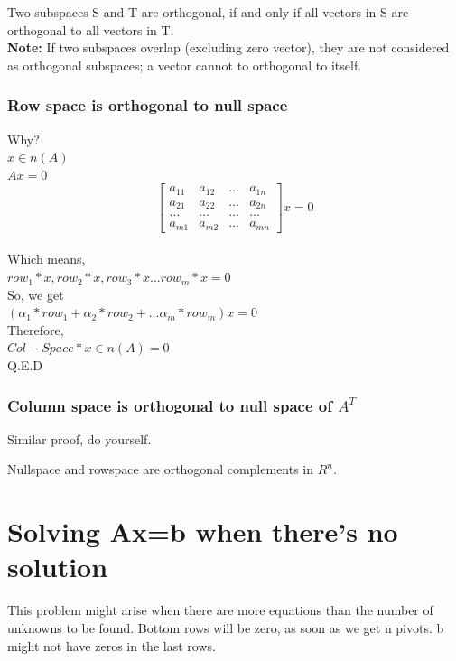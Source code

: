 \documentclass[]{article}
\begin{document}
Two subspaces S and T are orthogonal, if and only if all vectors in S are orthogonal to all vectors in T.\\

\textbf{Note:} If two subspaces overlap (excluding zero vector), they are not considered as orthogonal subspaces; a vector cannot to orthogonal to itself.

\subsubsection{Row space is orthogonal to null space}
Why?\\

$x\in n(A)$\\

$Ax=0$\\

\[
\begin{bmatrix}
	a_{11} & a_{12} &...& a_{1n}\\
	a_{21}& a_{22} &...&a_{2n}\\
	...&...&...&...\\
	a_{m1}&a_{m2}&...&a_{mn}
	
\end{bmatrix}x=0
\]\\

Which means,\\
$row_1*x, row_2*x, row_3*x... row_m*x=0$\\

So, we get\\

$(\alpha_1*row_1+\alpha_2*row_2+...\alpha_m*row_m)x =0$\\

Therefore, \\

$Col-Space * x\in n(A) = 0$\\

Q.E.D

\subsubsection{Column space is orthogonal to null space of $A^T$}

Similar proof, do yourself.

\begin{mytheorem}[title=Important Note]
	Nullspace and rowspace are orthogonal complements in $R^n$.
\end{mytheorem}
\vspace{10pt}
\section{Solving Ax=b when there's no solution}
\vspace{10pt}
This problem might arise when there are more equations than the number of unknowns to be found. Bottom rows will be zero, as soon as we get n pivots. b might not have zeros in the last rows.
\end{document}
